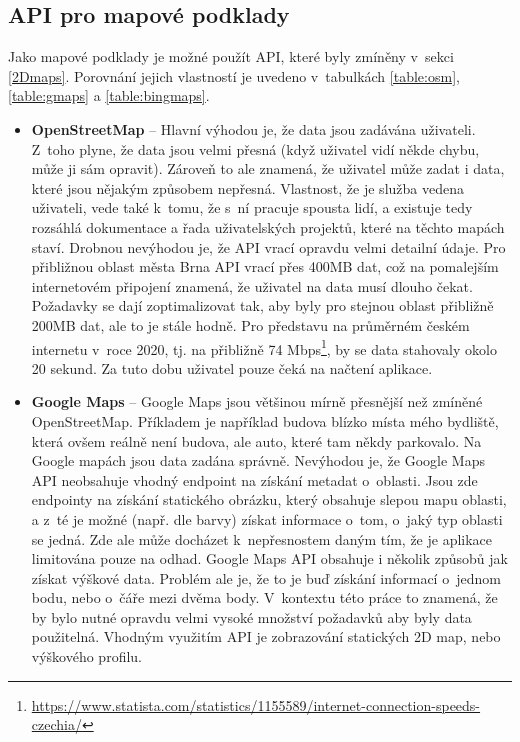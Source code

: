 \subsection*{API pro mapové podklady}
Jako mapové podklady je možné použít API, které byly zmíněny v~sekci \ref{2Dmaps}. Porovnání jejich vlastností je uvedeno v~tabulkách \ref{table:osm}, \ref{table:gmaps} a \ref{table:bingmaps}.
\begin{itemize}
    \item \textbf{OpenStreetMap} -- Hlavní výhodou je, že data jsou zadávána uživateli. Z~toho plyne, že data jsou velmi přesná (když uživatel vidí někde chybu, může ji sám opravit). Zároveň to ale znamená, že uživatel může zadat i data, které jsou nějakým způsobem nepřesná. Vlastnost, že je služba vedena uživateli, vede také k~tomu, že s~ní pracuje spousta lidí, a existuje tedy rozsáhlá dokumentace a řada uživatelských projektů, které na těchto mapách staví. Drobnou nevýhodou je, že API vrací opravdu velmi detailní údaje. Pro přibližnou oblast města Brna API vrací přes 400MB dat, což na pomalejším internetovém připojení znamená, že uživatel na data musí dlouho čekat. Požadavky se dají zoptimalizovat tak, aby byly pro stejnou oblast přibližně 200MB dat, ale to je stále hodně. Pro představu na průměrném českém internetu v~roce 2020, tj. na přibližně 74 Mbps\footnote{\href{https://www.statista.com/statistics/1155589/internet-connection-speeds-czechia/\#:~:text=As\%20of\%20December\%202020\%2C\%20the,slower\%2C\%20at\%20around\%2061.8\%20Mbps}{https://www.statista.com/statistics/1155589/internet-connection-speeds-czechia/}}, by se data stahovaly okolo 20 sekund. Za tuto dobu uživatel pouze čeká na načtení aplikace.

    \item \textbf{Google Maps} -- Google Maps jsou většinou mírně přesnější než zmíněné OpenStreetMap. Příkladem je například budova blízko místa mého bydliště, která ovšem reálně není budova, ale auto, které tam někdy parkovalo. Na Google mapách jsou data zadána správně. Nevýhodou je, že Google Maps API neobsahuje vhodný endpoint na získání metadat o~oblasti. Jsou zde endpointy na získání statického obrázku, který obsahuje slepou mapu oblasti, a z~té je možné (např. dle barvy) získat informace o~tom, o~jaký typ oblasti se jedná. Zde ale může docházet k~nepřesnostem daným tím, že je aplikace limitována pouze na odhad. Google Maps API obsahuje i několik způsobů jak získat výškové data. Problém ale je, že to je buď získání informací o~jednom bodu, nebo o~čáře mezi dvěma body. V~kontextu této práce to znamená, že by bylo nutné opravdu velmi vysoké množství požadavků aby byly data použitelná. Vhodným využitím API je zobrazování statických 2D map, nebo výškového profilu.


\end{itemize}
